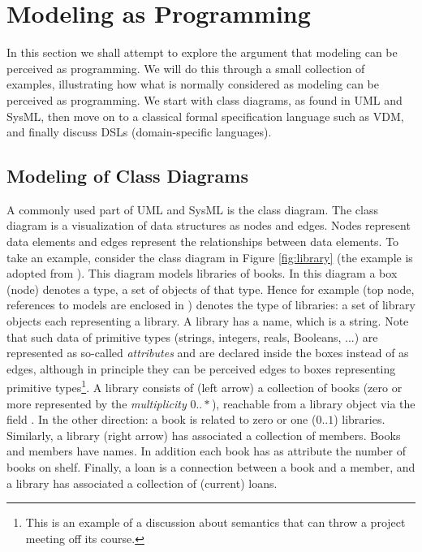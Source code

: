 
\section{Modeling as Programming}
\label{sec:modeling-as-programming}

In this section we shall attempt to explore the argument that
modeling can be perceived as programming. We will do this through
a small collection of examples, illustrating how what is normally
considered as modeling can be perceived as programming. We start
with class diagrams, as found in UML and SysML, then move on to
a classical formal specification language such as VDM, and finally discuss DSLs (domain-specific languages).

\subsection{Modeling of Class Diagrams}
\label{sec:complex-classes-in-scala}

A commonly used part of UML and SysML is the class diagram. The class diagram is a visualization of data structures as nodes and edges. Nodes represent data elements and edges represent the relationships between data elements. To take an
example, consider the class diagram in Figure \ref{fig:library}
(the example is adopted from \cite{oclinecoreTutorial}). This diagram models libraries of books. In this diagram a box (node) denotes a type, a set of objects of that type. Hence for example  
(top node, references to models are enclosed in ) denotes the type of libraries: a set
of library objects each representing a library.
A library has a name, which is a string. Note that
such data of primitive types (strings, integers, reals, Booleans, ...) are represented as so-called {\em attributes} and are declared inside the boxes instead of as edges, although in principle they can be perceived edges to boxes representing primitive types\footnote{This is an example of a discussion
about semantics that can throw a project meeting off its course.}. 
A library consists of (left arrow) 
a collection of books (zero or more represented by 
the {\em multiplicity} $0 .. *$),
reachable from a library object via the field . In the other direction: a book is related to zero or one ($0 .. 1$) libraries.
Similarly, a library (right arrow) has associated a collection of
members. Books and members have names. In addition each book has as
attribute the number of books on shelf. Finally, a loan is a 
connection between a book and a member, and a library has 
associated a collection of (current) loans.

